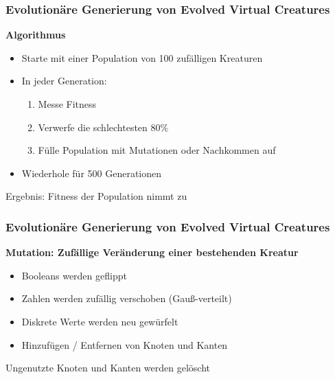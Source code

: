 \documentclass{beamer}
\begin{document}
\begin{frame}
	\frametitle{Evolutionäre Generierung von Evolved Virtual Creatures}
	\textbf{Algorithmus}\\
	\vspace{1em}
	
	\begin{itemize}
		\item Starte mit einer Population von 100 zufälligen Kreaturen \\
		\vspace{1em}
		\item In jeder Generation:
		\begin{enumerate}
			\item Messe Fitness
			\item Verwerfe die schlechtesten $80\%$
			\item Fülle Population mit Mutationen oder Nachkommen auf
		\end{enumerate}
		\vspace{1em}
		\item Wiederhole für 500 Generationen\\
	\end{itemize}
	\vspace{2em}
	Ergebnis: Fitness der Population nimmt zu \checkmark
\end{frame}

\begin{frame}
	\frametitle{Evolutionäre Generierung von Evolved Virtual Creatures}
	
	\textbf{Mutation: Zufällige Veränderung einer bestehenden Kreatur}
	\vspace{1em}
	\begin{itemize}
		\item Booleans werden geflippt
		\item Zahlen werden zufällig verschoben (Gauß-verteilt)
		\item Diskrete Werte werden neu gewürfelt
		\item Hinzufügen / Entfernen von Knoten und Kanten
	\end{itemize}
	\vspace{2em}
	Ungenutzte Knoten und Kanten werden gelöscht
\end{frame}
\end{document}
